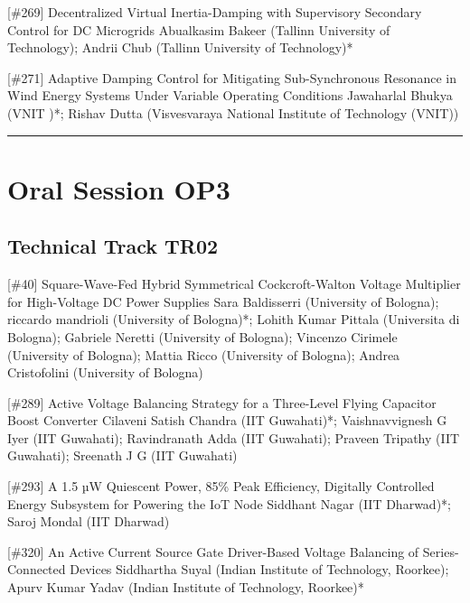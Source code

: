 {} \begin{abstract_online} {[\#269] Decentralized Virtual Inertia-Damping with Supervisory Secondary Control for DC Microgrids} {} {Abualkasim Bakeer (Tallinn University of Technology); Andrii Chub (Tallinn University of Technology)*} {}  \end{abstract_online} 
{} \begin{abstract_online} {[\#271] Adaptive Damping Control for Mitigating Sub-Synchronous Resonance in Wind Energy Systems Under Variable Operating Conditions} {} {Jawaharlal Bhukya (VNIT )*; Rishav Dutta  (Visvesvaraya National Institute of Technology (VNIT))} {}  \end{abstract_online} 
\hrule \section{Oral Session OP3}\nopagebreak \subsection{Technical Track TR02}\nopagebreak{} \begin{abstract_online} {[\#40] Square-Wave-Fed Hybrid Symmetrical Cockcroft-Walton Voltage Multiplier for High-Voltage DC Power Supplies} {} {Sara Baldisserri (University of Bologna); riccardo mandrioli (University of Bologna)*; Lohith Kumar Pittala (Universita di Bologna); Gabriele Neretti (University of Bologna); Vincenzo Cirimele (University of Bologna); Mattia Ricco (University of Bologna); Andrea Cristofolini (University of Bologna)} {}  \end{abstract_online} 
{} \begin{abstract_online} {[\#289] Active Voltage Balancing Strategy for a  Three-Level Flying Capacitor Boost Converter} {} {Cilaveni Satish Chandra (IIT Guwahati)*; Vaishnavvignesh G Iyer (IIT Guwahati); Ravindranath Adda (IIT Guwahati); Praveen Tripathy (IIT Guwahati); Sreenath J G (IIT Guwahati)} {}  \end{abstract_online} 
{} \begin{abstract_online} {[\#293] A 1.5 µW Quiescent Power, 85\% Peak Efficiency, Digitally Controlled Energy Subsystem for Powering the IoT Node} {} {Siddhant Nagar (IIT Dharwad)*; Saroj  Mondal (IIT Dharwad)} {}  \end{abstract_online} 
{} \begin{abstract_online} {[\#320] An Active Current Source Gate Driver-Based  Voltage Balancing of Series-Connected Devices} {} {Siddhartha Suyal (Indian Institute of Technology, Roorkee); Apurv Kumar Yadav (Indian Institute of Technology, Roorkee)*} {}  \end{abstract_online} 

